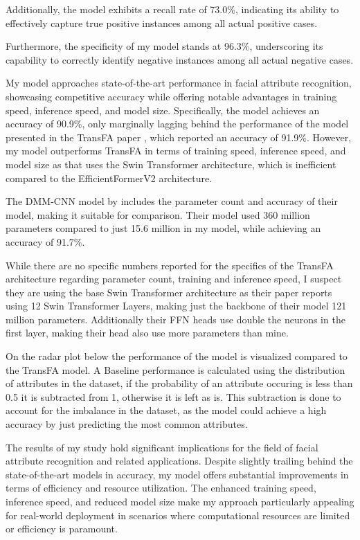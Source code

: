 \documentclass[a4paper,oneside]{article}
\begin{document}
Additionally, the model exhibits a recall rate of 73.0\%, indicating its ability to effectively capture true positive instances among all actual positive cases.

Furthermore, the specificity of my model stands at 96.3\%, underscoring its capability to correctly identify negative instances among all actual negative cases.

My model approaches state-of-the-art performance in facial attribute recognition, showcasing competitive accuracy while offering notable advantages in training speed, inference speed, and model size.
Specifically, the model achieves an accuracy of 90.9\%, only marginally lagging behind the performance of the model presented in the TransFA paper \citet{liu2022transfa}, which reported an accuracy of 91.9\%.
However, my model outperforms TransFA in terms of training speed, inference speed, and model size as that uses the Swin Transformer architecture, which is inefficient compared to the EfficientFormerV2 architecture.

The DMM-CNN model by \citet{DBLP:journals/corr/abs-2002-03683} includes the parameter count and accuracy of their model, making it suitable for comparison.
Their model used 360 million parameters compared to just 15.6 million in my model, while achieving an accuracy of 91.7\%.

While there are no specific numbers reported for the specifics of the TransFA architecture regarding parameter count, training and inference speed,
I suspect they are using the base Swin Transformer architecture as their paper reports using 12 Swin Transformer Layers, making just the backbone of their model 121 million parameters.
Additionally their FFN heads use double the neurons in the first layer, making their head also use more parameters than mine.

On the radar plot below the performance of the model is visualized compared to the TransFA model.
A Baseline performance is calculated using the distribution of attributes in the dataset, if the probability of an attribute occuring is less than 0.5 it is subtracted from 1, otherwise it is left as is.
This subtraction is done to account for the imbalance in the dataset, as the model could achieve a high accuracy by just predicting the most common attributes.

The results of my study hold significant implications for the field of facial attribute recognition and related applications.
Despite slightly trailing behind the state-of-the-art models in accuracy, my model offers substantial improvements in terms of efficiency and resource utilization.
The enhanced training speed, inference speed, and reduced model size make my approach particularly appealing for real-world deployment in scenarios where computational resources are limited or efficiency is paramount.
\end{document}
